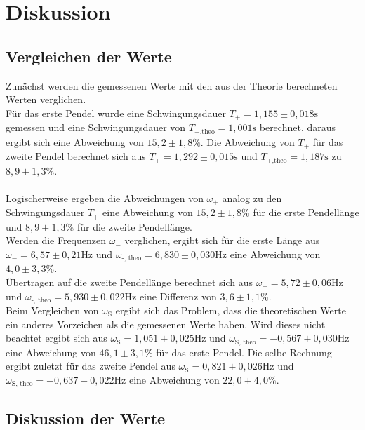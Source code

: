 \section{Diskussion}

    \subsection{Vergleichen der Werte}
    
        \noindent Zunächst werden die gemessenen Werte mit den aus der Theorie berechneten Werten verglichen. \\
        Für das erste Pendel wurde eine 
        Schwingungsdauer $T_+ = 1,155 \pm 0,018 \si{\s}$ gemessen und eine Schwingungsdauer von $T_{+\text{,theo}} = 1,001 \si{\s}$ berechnet,
        daraus ergibt sich eine Abweichung von $15,2 \pm 1,8 \%$.
        Die Abweichung von $T_+$ für das zweite Pendel berechnet sich aus $T_+ = 1,292 \pm 0,015 \si{\s}$ und 
        $T_{+\text{,theo}} = 1,187 \si{\s}$ zu $8,9 \pm 1,3 \%$.\\\\
        Logischerweise ergeben die Abweichungen von $\omega_+$ analog zu den Schwingungsdauer $T_+$ eine Abweichung von $15,2 \pm 1,8 \%$ 
        für die erste Pendellänge und $8,9 \pm 1,3 \%$ für die zweite Pendellänge.\\
        Werden die Frequenzen $\omega_-$ verglichen, ergibt sich für die erste Länge aus $\omega_{-} = 6,57 \pm 0,21 \si{\hertz}$ und
        $\omega_\text{-, theo} = 6,830 \pm 0,030 \si{\hertz}$ eine Abweichung von $ 4,0 \pm 3,3 \%$. \\
        Übertragen auf die zweite Pendellänge berechnet sich aus  $\omega_{-} = 5,72 \pm 0,06 \si{\hertz}$ und 
        $\omega_\text{-, theo} = 5,930 \pm 0,022 \si{\hertz}$ eine Differenz von $ 3,6 \pm 1,1 \%$.\\
        Beim Vergleichen von $\omega_{\text{S}}$ ergibt sich das Problem, dass die theoretischen Werte ein anderes Vorzeichen als die gemessenen 
        Werte haben. Wird dieses nicht beachtet ergibt sich aus $\omega_{\text{S}}= 1,051 \pm 0,025 \si{\hertz}$ und 
        $\omega_\text{S, theo} = -0,567 \pm 0,030 \si{\hertz}$ eine Abweichung von $46,1 \pm 3,1 \%$ für das erste Pendel.
        Die selbe Rechnung ergibt zuletzt für das zweite Pendel aus $ \omega_{\text{S}}= 0,821 \pm 0,026 \si{\hertz}$ und 
        $\omega_\text{S, theo} = -0,637 \pm 0,022 \si{\hertz}$ eine Abweichung von $ 22,0 \pm 4,0 \%$.
       
    \subsection{Diskussion der Werte}

